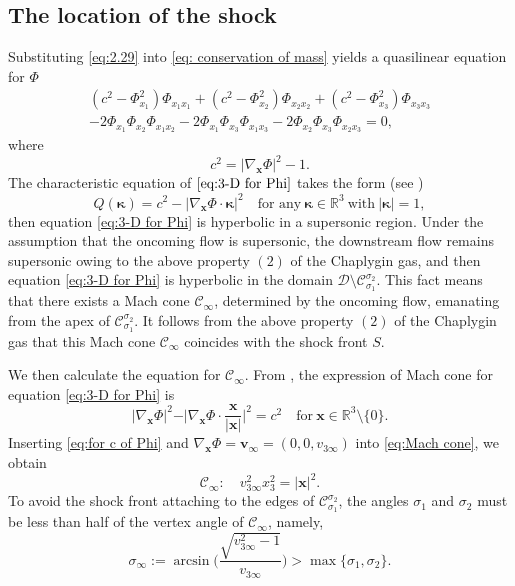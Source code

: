 \documentclass[reqno,12pt]{amsart}
\numberwithin{equation}{section}
\begin{document}
\subsection{The location of the shock}\label{sec:2.1}
Substituting \eqref{eq:2.29} into \eqref{eq: conservation of mass} yields a quasilinear equation for $\Phi$
\begin{multline}\label{eq:3-D for Phi}	
(c^{2}-\Phi^{2}_{x_{1}})\Phi_{x_{1}x_{1}}+(c^{2}-\Phi^{2}_{x_{2}})\Phi_{x_{2}x_{2}}+(c^{2}-\Phi^{2}_{x_{3}})\Phi_{x_{3}x_{3}}\\-2\Phi_{x_{1}}\Phi_{x_{2}}\Phi_{x_{1}x_{2}}-2\Phi_{x_{1}}\Phi_{x_{3}}\Phi_{x_{1}x_{3}}-2\Phi_{x_{2}}\Phi_{x_{3}}\Phi_{x_{2}x_{3}}=0,
\end{multline}
where
\begin{equation}\label{eq:for c of Phi}
	c^2=|\nabla_{\bm{x}}\Phi|^{2}-1.
\end{equation}
The characteristic equation of $\eqref{eq:3-D for Phi}$ takes the form (see \cite[Lemma 1.1]{CY15})
\begin{equation}\label{eq:2.31}
	Q(\bm{\kappa})=c^{2}-|\nabla_{\bm{x}}\Phi\cdot\bm{\kappa}|^{2} \quad\text{for any}~\bm{\kappa}\in\mathbb{R}^{3}~\text{with}~|\bm{\kappa}|=1,
\end{equation}
then equation \eqref{eq:3-D for Phi} is hyperbolic in a supersonic region. Under the assumption that the oncoming flow is supersonic, the downstream flow remains supersonic owing to the above property $(2)$ of the Chaplygin gas, and then equation \mbox{\eqref{eq:3-D for Phi}} is hyperbolic in the domain $\mathcal{D}\setminus \mathcal{C}_{\sigma_1}^{\sigma_2}$. This fact means that there exists a Mach cone $\mathcal{C}_{\infty}$, determined by the oncoming flow, emanating from the apex of $ \mathcal{C}_{\sigma_1}^{\sigma_2}$. It follows from the above property $(2)$ of the Chaplygin gas that this Mach cone $\mathcal{C}_{\infty}$ coincides with the shock front $S$.

We then calculate the equation for $\mathcal{C}_{\infty}$. From \cite[Appendix B]{LY22}, the expression of Mach cone for equation \eqref{eq:3-D for Phi} is 
\begin{equation}\label{eq:Mach cone}
	|\nabla_{\bm{x}}\Phi|^{2}-\vert \nabla_{\bm{x}}\Phi\cdot\frac{\bm{x}}{|\bm{x}|}\vert^{2}=c^{2}\quad\text{for}~\bm{x}\in\mathbb{R}^{3}\setminus\{0\}.
\end{equation}
Inserting \eqref{eq:for c of Phi} and $\nabla_{\bm{x}}\Phi=\bm{v}_{\infty}=(0,0,v_{3\infty})$ into \eqref{eq:Mach cone}, we obtain
\begin{equation}\label{eq:Mach cone C}
	\mathcal{C}_{\infty}:\quad v_{3\infty}^2x^2_3=|\bm{x}|^2.
\end{equation}
To avoid the shock front attaching to the edges of $\mathcal{C}_{\sigma_1}^{\sigma_2}$, the angles $\sigma_1$ and $\sigma_2$ must be less than half of the vertex angle of $\mathcal{C}_{\infty}$, namely,
\begin{equation}\label{eq: for sigma limit}
	\sigma_\infty:=\arcsin\Big(\dfrac{\sqrt{v^2_{3\infty}-1}}{v_{3\infty}}\Big)>\max\{\sigma_1,\sigma_2\}.
\end{equation}
\end{document}
